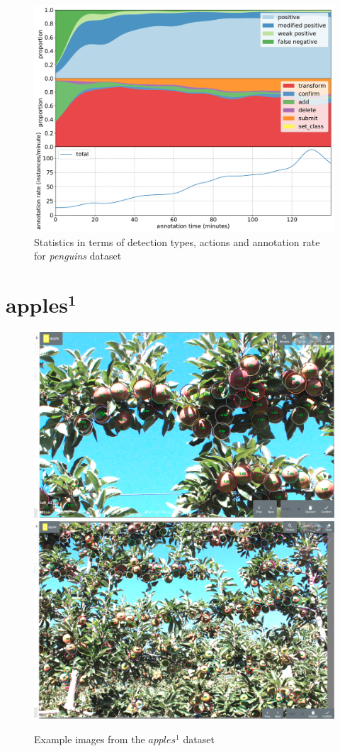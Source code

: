 \begin{figure}[!h]
\centering
\includegraphics[width=1.0\linewidth]{charts/action_annotations/penguins.pdf}
\caption{Statistics in terms of detection types, actions and annotation rate for \emph{penguins} dataset}
\label{fig:penguin_annotation}
\end{figure}



\pagebreak
\section{$\mathbf{apples^1}$}
\label{sec:apples1_details}

\begin{figure}[!h]
  \includegraphics[width=0.475\linewidth]{figures/annotation/screenshots/apples_big.png}
  \hfill
  \includegraphics[width=0.45\linewidth]{figures/annotation/screenshots/apples_small.png}
\caption{Example images from the $apples^1$ dataset}
\label{fig:apples1_dataset}  
\end{figure}

